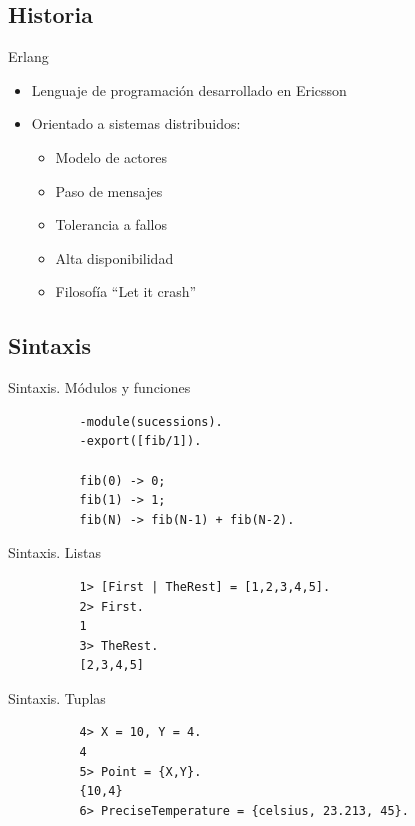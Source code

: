 \documentclass{beamer}
\begin{document}
    \subsection{Historia}
      \begin{frame}{Erlang}
        \begin{itemize}
          \item Lenguaje de programación desarrollado en Ericsson
          \item Orientado a sistemas distribuidos:
          \begin{itemize}
            \item Modelo de actores
            \item Paso de mensajes
            \item Tolerancia a fallos
            \item Alta disponibilidad
            \item Filosofía ``Let it crash''
          \end{itemize}
        \end{itemize}
      \end{frame}

    \subsection{Sintaxis}
      \begin{frame}[fragile]{Sintaxis. Módulos y funciones}
        \begin{verbatim}
          -module(sucessions).
          -export([fib/1]).

          fib(0) -> 0;
          fib(1) -> 1;
          fib(N) -> fib(N-1) + fib(N-2).
        \end{verbatim}
      \end{frame}

      \begin{frame}[fragile]{Sintaxis. Listas}
        \begin{verbatim}
          1> [First | TheRest] = [1,2,3,4,5].
          2> First.
          1
          3> TheRest.
          [2,3,4,5]
        \end{verbatim}
      \end{frame}

      \begin{frame}[fragile]{Sintaxis. Tuplas}
        \begin{verbatim}
          4> X = 10, Y = 4.
          4
          5> Point = {X,Y}.
          {10,4}
          6> PreciseTemperature = {celsius, 23.213, 45}.
        \end{verbatim}
      \end{frame}
\end{document}
